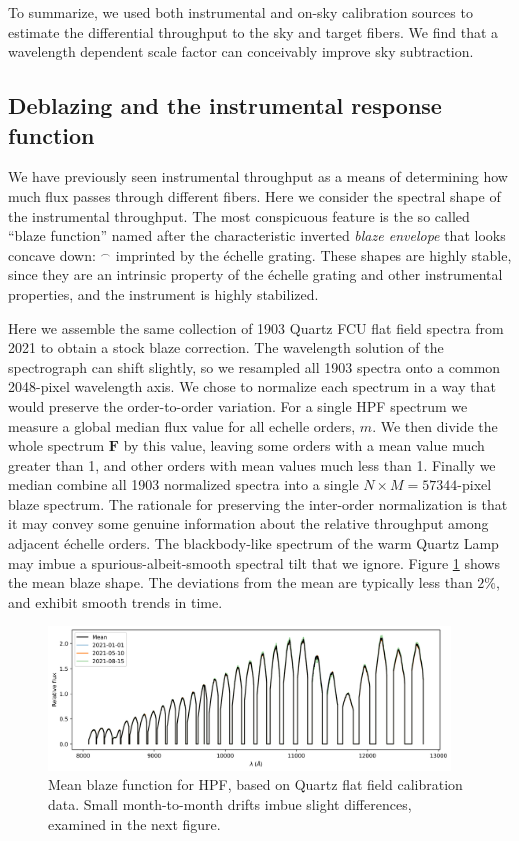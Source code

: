 \documentclass[modern]{aastex631}
\begin{document}
To summarize, we used both instrumental and on-sky calibration sources to estimate the differential throughput to the sky and target fibers.  We find that a wavelength dependent scale factor can conceivably improve sky subtraction.

\subsection{Deblazing and the instrumental response function}

We have previously seen instrumental throughput as a means of determining how much flux passes through different fibers.  Here we consider the spectral shape of the instrumental throughput.  The most conspicuous feature is the so called ``blaze function'' named after the characteristic inverted \emph{blaze envelope} that looks concave down: $^\frown$ imprinted by the \'echelle grating.  These shapes are highly stable, since they are an intrinsic property of the \'echelle grating and other instrumental properties, and the instrument is highly stabilized.

Here we assemble the same collection of 1903 Quartz FCU flat field spectra from 2021 to obtain a stock blaze correction.  The wavelength solution of the spectrograph can shift slightly, so we resampled all 1903 spectra onto a common 2048-pixel wavelength axis. We chose to normalize each spectrum in a way that would preserve the order-to-order variation.  For a single HPF spectrum we measure a global median flux value for all echelle orders, $m$.  We then divide the whole spectrum $\mathbf{F}$ by this value, leaving some orders with a mean value much greater than 1, and other orders with mean values much less than 1.  Finally we median combine all 1903 normalized spectra into a single $N\times M=57344$-pixel blaze spectrum.  The rationale for preserving the inter-order normalization is that it may convey some genuine information about the relative throughput among adjacent \'echelle orders.  The blackbody-like spectrum of the warm Quartz Lamp may imbue a spurious-albeit-smooth spectral tilt that we ignore.  Figure \ref{fig:blaze} shows the mean blaze shape.  The deviations from the mean are typically less than $2\%$, and exhibit smooth trends in time.

\begin{figure}[ht]
  \centering
  \includegraphics[width=0.95\textwidth]{figures/HPF_mean_blaze_function.png}
\caption{Mean blaze function for HPF, based on Quartz flat field calibration data.  Small month-to-month drifts imbue slight differences, examined in the next figure.}
\label{fig:blaze}
\end{figure}
\end{document}
